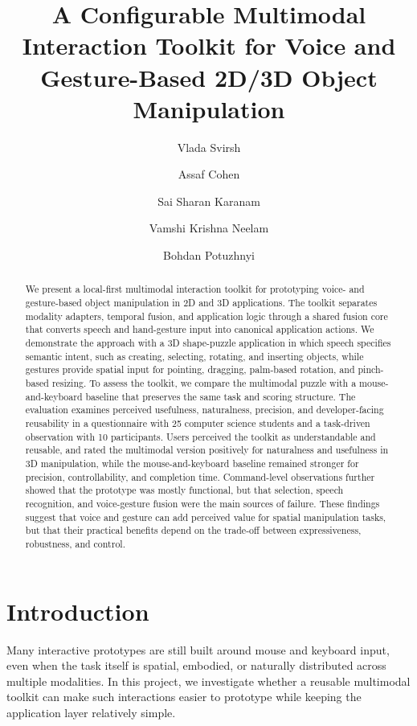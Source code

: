 \documentclass[sigconf]{acmart}
\title{A Configurable Multimodal Interaction Toolkit for Voice and Gesture-Based 2D/3D Object Manipulation}
\author{Vlada Svirsh}
\affiliation{%
  \institution{University of Bern}
  \institution{Bern University of Applied Sciences}
  \country{Switzerland}
}
\author{Assaf Cohen}
\affiliation{%
  \institution{University of Fribourg}
  \country{Switzerland}
}
\author{Sai Sharan Karanam}
\affiliation{%
  \institution{University of Neuchâtel}
  \country{Switzerland}
}
\author{Vamshi Krishna Neelam}
\affiliation{%
  \institution{University of Bern}
  \country{Switzerland}
}
\author{Bohdan Potuzhnyi}
\affiliation{%
  \institution{University of Bern}
  \country{Switzerland}
}
\begin{document}
\begin{abstract}
We present a local-first multimodal interaction toolkit for prototyping voice- and gesture-based object manipulation in
2D and 3D applications. The toolkit separates modality adapters, temporal fusion, and application logic through a shared
fusion core that converts speech and hand-gesture input into canonical application actions. We demonstrate the approach
with a 3D shape-puzzle application in which speech specifies semantic intent, such as creating, selecting, rotating,
and inserting objects, while gestures provide spatial input for pointing, dragging, palm-based rotation, and pinch-based
resizing. To assess the toolkit, we compare the multimodal puzzle with a mouse-and-keyboard baseline that preserves
the same task and scoring structure. The evaluation examines perceived usefulness, naturalness,
precision, and developer-facing reusability in a questionnaire with 25 computer science students and
a task-driven observation with 10 participants. Users perceived the toolkit as understandable and reusable, and rated
the multimodal version positively for naturalness and usefulness in 3D manipulation, while the mouse-and-keyboard
baseline remained stronger for precision, controllability, and completion time. Command-level observations further
showed that the prototype was mostly functional, but that selection, speech recognition, and voice-gesture fusion were
the main sources of failure. These findings suggest that voice and gesture can add perceived value for spatial
manipulation tasks, but that their practical benefits depend on the trade-off between expressiveness, robustness, and
control.
\end{abstract}

\maketitle

\begingroup
\renewcommand\thefootnote{}
\addtocounter{footnote}{-1}
\endgroup

\section{Introduction}
Many interactive prototypes are still built around mouse and keyboard input, even
when the task itself is spatial, embodied, or naturally distributed across
multiple modalities. In this project, we investigate whether a reusable
multimodal toolkit can make such interactions easier to prototype while keeping
the application layer relatively simple.
\end{document}
